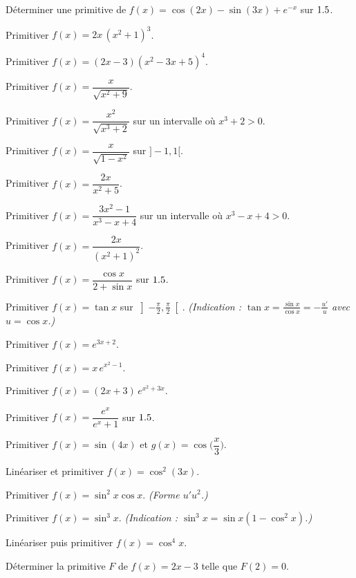 \exo{} Déterminer une primitive de $f(x)=\cos(2x)-\sin(3x)+e^{-x}$ sur $1.5$.

\exo{} Primitiver $f(x)=2x\,(x^{2}+1)^{3}$.

\exo{} Primitiver $f(x)=(2x-3)(x^{2}-3x+5)^{4}$.

\exo{} Primitiver $f(x)=\dfrac{x}{\sqrt{x^{2}+9}}$.

\exo{} Primitiver $f(x)=\dfrac{x^{2}}{\sqrt{x^{3}+2}}$ sur un intervalle où $x^{3}+2>0$.

\exo{} Primitiver $f(x)=\dfrac{x}{\sqrt{1-x^{2}}}$ sur $]-1,1[$.

\exo{} Primitiver $f(x)=\dfrac{2x}{x^{2}+5}$.

\exo{} Primitiver $f(x)=\dfrac{3x^{2}-1}{x^{3}-x+4}$ sur un intervalle où $x^{3}-x+4>0$.

\exo{} Primitiver $f(x)=\dfrac{2x}{(x^{2}+1)^{2}}$.

\exo{} Primitiver $f(x)=\dfrac{\cos x}{2+\sin x}$ sur $1.5$.

\exo{} Primitiver $f(x)=\tan x$ sur $\left]-\frac\pi2,\frac\pi2\right[$.
\emph{(Indication : $\tan x=\frac{\sin x}{\cos x}=-\frac{u'}{u}$ avec $u=\cos x$.)}

\exo{} Primitiver $f(x)=e^{3x+2}$.

\exo{} Primitiver $f(x)=x\,e^{x^{2}-1}$.

\exo{} Primitiver $f(x)=(2x+3)\,e^{x^{2}+3x}$.

\exo{} Primitiver $f(x)=\dfrac{e^{x}}{e^{x}+1}$ sur $1.5$.

\exo{} Primitiver $f(x)=\sin(4x)$ et $g(x)=\cos\!\Big(\dfrac x3\Big)$.

\exo{} Linéariser et primitiver $f(x)=\cos^{2}(3x)$.

\exo{} Primitiver $f(x)=\sin^{2}x\cos x$. \emph{(Forme $u'u^{2}$.)}

\exo{} Primitiver $f(x)=\sin^{3}x$. \emph{(Indication : $\sin^{3}x=\sin x(1-\cos^{2}x)$.)}

\exo{} Linéariser puis primitiver $f(x)=\cos^{4}x$.

\exo{} Déterminer la primitive $F$ de $f(x)=2x-3$ telle que $F(2)=0$.

